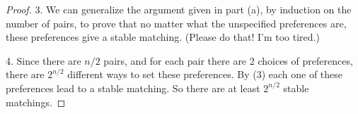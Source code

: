 \documentclass[14pt]{extarticle}
\begin{document}
\begin{proof}
3. We can generalize the argument given in part (a), by induction on the number of pairs, to prove that no matter what the unspecified preferences are, these preferences give a stable matching. (Please do that! I'm too tired.)

4. Since there are $n/2$ pairs, and for each pair there are 2 choices of preferences, there are $2^{n/2}$ different ways to set these preferences. By (3) each one of these preferences lead to a stable matching. So there are at least $2^{n/2}$ stable matchings.
\end{proof}
\end{document}
